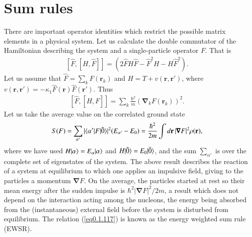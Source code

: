 \section{Sum rules}\label{Sect1.7}
There are important operator identities which restrict the possible matrix elements in a physical system. Let us calculate the double commutator of the Hamiltonian describing the system and a single-particle operator $F$. That is
\begin{align}\label{eq0.1.115}
\left[\hat F,\left[H,\hat F\right]\right]=\left(2\hat FH\hat F-\hat F^2H-H\hat F^2\right).
\end{align}
Let us assume that $\hat F=\sum_k F(\mathbf r_k)$ and $H=T+v(\mathbf r, \mathbf r')$, where $v(\mathbf r,\mathbf r')=-\kappa_1 \hat F(\mathbf r)\hat F(\mathbf r')$. Thus 
\begin{align}\label{eq0.1.116}
\left[\hat F,\left[H,\hat F\right]\right]=\sum_k\frac{\hbar^2}{m}\left(\pmb \nabla_kF(\mathbf r_k)\right)^2.
\end{align}
Let us take the average value on the correlated ground state
\begin{align}\label{eq0.1.117}
S(F)=\sum_{\alpha'}|\langle {\alpha'|F|\tilde 0} \rangle|^2(E_{\alpha'}-E_0)=\frac{\hbar^2}{2m}\int d\mathbf r\, |\pmb\nabla F|^2\rho(\mathbf r),
\end{align}
where we have used $H|{\alpha} \rangle=E_\alpha|{\alpha} \rangle$ and $H|{\tilde 0} \rangle=E_0|{\tilde 0} \rangle$, and the sum $\sum_{\alpha'}$ is over the complete set of eigenstates of the system. The above result describes the reaction of a system at equilibrium to which one applies an impulsive field, giving to the particles a momentum $\pmb \nabla F$. On the average, the particles started at rest so their mean energy after the sudden impulse is $\hbar^2|\pmb \nabla F|^2/2m$, a result which does not depend on the interaction acting among the nucleons, the energy being absorbed from the (instantaneous) external field before the system is disturbed from equilibrium. The relation (\ref{eq0.1.117}) is known as the energy weighted sum rule (EWSR). 

